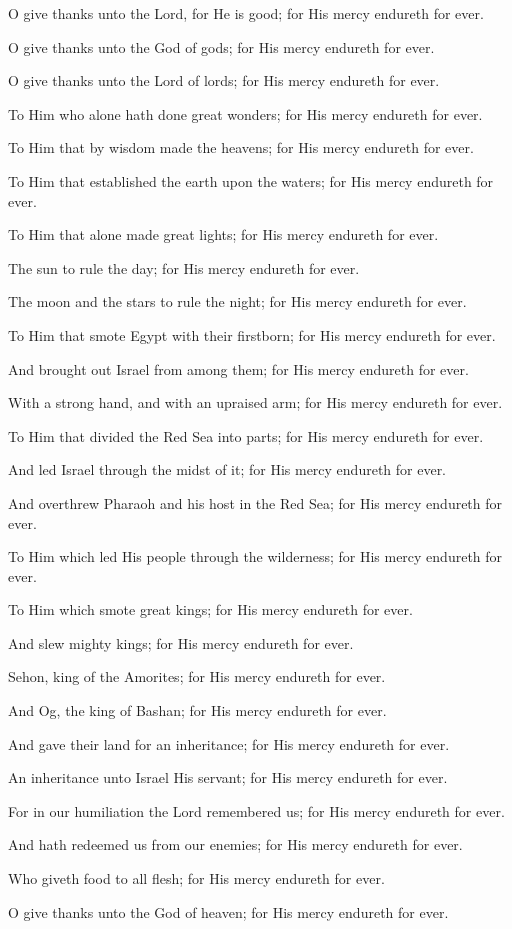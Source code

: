 O give thanks unto the Lord, for He is good; for His mercy endureth for ever.

O give thanks unto the God of gods; for His mercy endureth for ever.

O give thanks unto the Lord of lords; for His mercy endureth for ever.

To Him who alone hath done great wonders; for His mercy endureth for ever.

To Him that by wisdom made the heavens; for His mercy endureth for ever.

To Him that established the earth upon the waters; for His mercy endureth for ever.

To Him that alone made great lights; for His mercy endureth for ever.

The sun to rule the day; for His mercy endureth for ever.

The moon and the stars to rule the night; for His mercy endureth for ever.

To Him that smote Egypt with their firstborn; for His mercy endureth for ever.

And brought out Israel from among them; for His mercy endureth for ever.

With a strong hand, and with an upraised arm; for His mercy endureth for ever.

To Him that divided the Red Sea into parts; for His mercy endureth for ever.

And led Israel through the midst of it; for His mercy endureth for ever.

And overthrew Pharaoh and his host in the Red Sea; for His mercy endureth for ever.

To Him which led His people through the wilderness; for His mercy endureth for ever.

To Him which smote great kings; for His mercy endureth for ever.

And slew mighty kings; for His mercy endureth for ever.

Sehon, king of the Amorites; for His mercy endureth for ever.

And Og, the king of Bashan; for His mercy endureth for ever.

And gave their land for an inheritance; for His mercy endureth for ever.

An inheritance unto Israel His servant; for His mercy endureth for ever.

For in our humiliation the Lord remembered us; for His mercy endureth for ever.

And hath redeemed us from our enemies; for His mercy endureth for ever.

Who giveth food to all flesh; for His mercy endureth for ever.

O give thanks unto the God of heaven; for His mercy endureth for ever.
